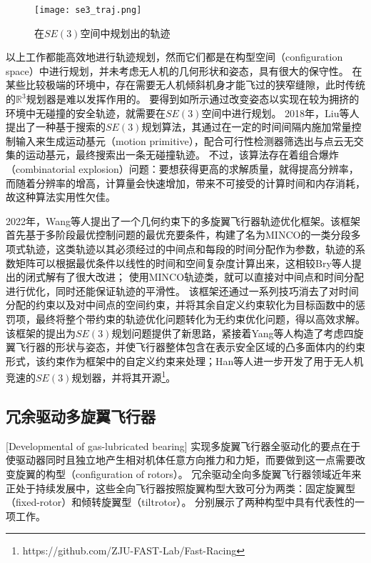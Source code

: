 \begin{figure}[ht]
    \centering
    \texttt{[image: se3\_traj.png]}
    \caption{在$SE(3)$空间中规划出的轨迹\cite{han2021fast}}
    \label{fig:se3_traj}
\end{figure}

以上工作都能高效地进行轨迹规划，然而它们都是在构型空间（configuration space）中进行规划，并未考虑无人机的几何形状和姿态，具有很大的保守性。
在某些比较极端的环境中，存在需要无人机倾斜机身才能飞过的狭窄缝隙，此时传统的$\mathbb{R}^3$规划器是难以发挥作用的。
要得到如所示通过改变姿态以实现在较为拥挤的环境中无碰撞的安全轨迹，就需要在$SE(3)$空间中进行规划。
2018年，Liu等人提出了一种基于搜索的$SE(3)$规划算法\cite{liu2018search}，其通过在一定的时间间隔内施加常量控制输入来生成运动基元（motion primitive），配合可行性检测器筛选出与点云无交集的运动基元，最终搜索出一条无碰撞轨迹。
不过，该算法存在着组合爆炸（combinatorial explosion）问题：要想获得更高的求解质量，就得提高分辨率，而随着分辨率的增高，计算量会快速增加，带来不可接受的计算时间和内存消耗，故这种算法实用性欠佳。

2022年，Wang等人提出了一个几何约束下的多旋翼飞行器轨迹优化框架\cite{wang2022geometrically}。该框架首先基于多阶段最优控制问题的最优充要条件，构建了名为MINCO的一类分段多项式轨迹，这类轨迹以其必须经过的中间点和每段的时间分配作为参数，轨迹的系数矩阵可以根据最优条件以线性的时间和空间复杂度计算出来，这相较Bry等人提出的闭式解\cite{bry2015aggressive}有了很大改进；
使用MINCO轨迹类，就可以直接对中间点和时间分配进行优化，同时还能保证轨迹的平滑性。
该框架还通过一系列技巧消去了对时间分配的约束以及对中间点的空间约束，并将其余自定义约束软化为目标函数中的惩罚项，最终将整个带约束的轨迹优化问题转化为无约束优化问题，得以高效求解。
该框架的提出为$SE(3)$规划问题提供了新思路，紧接着Yang等人构造了考虑四旋翼飞行器的形状与姿态，并使飞行器整体包含在表示安全区域的凸多面体内的约束形式\cite{yang2021whole}，该约束作为框架中的自定义约束来处理；Han等人进一步开发了用于无人机竞速的$SE(3)$规划器\cite{han2021fast}，并将其开源\footnote{https://github.com/ZJU-FAST-Lab/Fast-Racing}。


\subsection{冗余驱动多旋翼飞行器}[Developmental of gas-lubricated bearing]
实现多旋翼飞行器全驱动化的要点在于使驱动器同时且独立地产生相对机体任意方向推力和力矩，而要做到这一点需要改变旋翼的构型（configuration of rotors）。
冗余驱动全向多旋翼飞行器领域近年来正处于持续发展中，这些全向飞行器按照旋翼构型大致可分为两类：固定旋翼型（fixed-rotor）\cite{brescianini2016design, park2018odar,allenspach2020design}和倾转旋翼型（tiltrotor）\cite{ryll2014novel, kamel2018voliro,wang2022geometrically}。
分别展示了两种构型中具有代表性的一项工作。

